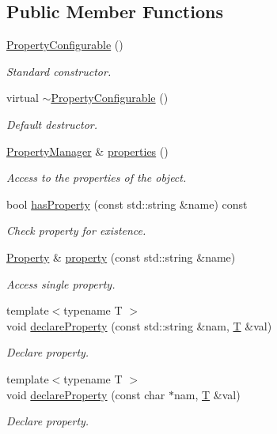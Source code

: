 \subsection*{Public Member Functions}
\begin{DoxyCompactItemize}
\item 
\hyperlink{class_d_d4hep_1_1_property_configurable_a06572f4bb82632232b0b503f56fda784}{Property\+Configurable} ()
\begin{DoxyCompactList}\small\item\em Standard constructor. \end{DoxyCompactList}\item 
virtual \hyperlink{class_d_d4hep_1_1_property_configurable_a49ef91ca6bbdf3f9d835e5f18f3a3a27}{$\sim$\+Property\+Configurable} ()
\begin{DoxyCompactList}\small\item\em Default destructor. \end{DoxyCompactList}\item 
\hyperlink{class_d_d4hep_1_1_property_manager}{Property\+Manager} \& \hyperlink{class_d_d4hep_1_1_property_configurable_af6f3ad08d1cb9d831d8f89255c403d1c}{properties} ()
\begin{DoxyCompactList}\small\item\em Access to the properties of the object. \end{DoxyCompactList}\item 
bool \hyperlink{class_d_d4hep_1_1_property_configurable_ad3c5d3806bc3a4081a2b923918da894c}{has\+Property} (const std\+::string \&name) const
\begin{DoxyCompactList}\small\item\em Check property for existence. \end{DoxyCompactList}\item 
\hyperlink{class_d_d4hep_1_1_property}{Property} \& \hyperlink{class_d_d4hep_1_1_property_configurable_a01af296a9510638b4a1818fb0baef5c5}{property} (const std\+::string \&name)
\begin{DoxyCompactList}\small\item\em Access single property. \end{DoxyCompactList}\item 
{\footnotesize template$<$typename T $>$ }\\void \hyperlink{class_d_d4hep_1_1_property_configurable_ae05fd8e07c3bf4f89b9bcc84714a7950}{declare\+Property} (const std\+::string \&nam, \hyperlink{class_t}{T} \&val)
\begin{DoxyCompactList}\small\item\em Declare property. \end{DoxyCompactList}\item 
{\footnotesize template$<$typename T $>$ }\\void \hyperlink{class_d_d4hep_1_1_property_configurable_a8883181e55de099110ac51b04b7b8da1}{declare\+Property} (const char $\ast$nam, \hyperlink{class_t}{T} \&val)
\begin{DoxyCompactList}\small\item\em Declare property. \end{DoxyCompactList}\end{DoxyCompactItemize}
